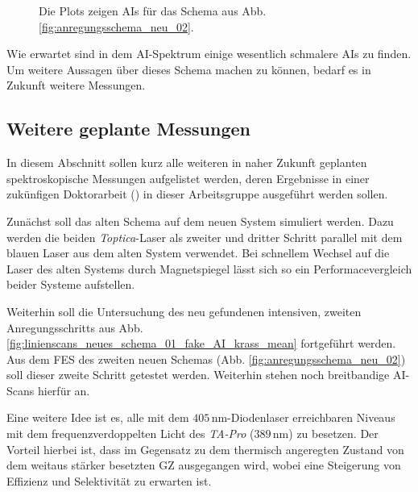 \begin{figure}[hp]
 	\centering
 	\footnotesize
	\caption[erster und zweiter Anregungsschritt, neues System, Schema (2)]{Die
	Plots zeigen AIs für das Schema aus Abb. \ref{fig:anregungsschema_neu_02}.}
	\label{fig:linienscans_neues_schema_02_AIs}
\end{figure}
Wie erwartet sind in dem AI-Spektrum einige wesentlich schmalere AIs zu finden.
Um weitere Aussagen über dieses Schema machen zu können, bedarf es in
Zukunft weitere Messungen.

\subsection{Weitere geplante
Messungen}\label{subsec:geplante_messungen}
In diesem Abschnitt sollen kurz alle weiteren in naher Zukunft geplanten
spektroskopische Messungen aufgelistet werden, deren Ergebnisse in einer
zukünfigen Doktorarbeit (\cite{hakimi:2012:dissertation}) in dieser Arbeitsgruppe ausgeführt werden
sollen.\par
Zunächst soll das alten Schema auf dem neuen System simuliert werden. Dazu
werden die beiden \textit{Toptica}-Laser als zweiter und dritter Schritt
parallel mit dem blauen Laser aus dem alten System verwendet. Bei schnellem
Wechsel auf die Laser des alten Systems durch Magnetspiegel lässt sich so ein
Performacevergleich beider Systeme aufstellen.\par
Weiterhin soll die Untersuchung des neu gefundenen intensiven, zweiten
Anregungsschritts aus Abb.
\ref{fig:linienscans_neues_schema_01_fake_AI_krass_mean} fortgeführt werden. Aus
dem FES des zweiten neuen Schemas
(Abb. \ref{fig:anregungsschema_neu_02}) soll dieser zweite Schritt getestet
werden. Weiterhin stehen noch breitbandige AI-Scans hierfür an.\par
Eine weitere Idee ist es, alle mit dem $405\,$nm-Diodenlaser erreichbaren
Niveaus mit dem frequenzverdoppelten Licht des \textit{TA-Pro} ($389\,$nm) zu
besetzen. Der Vorteil hierbei ist, dass im Gegensatz zu dem thermisch angeregten
Zustand von dem weitaus stärker besetzten GZ ausgegangen wird, wobei eine
Steigerung von Effizienz und Selektivität zu erwarten ist.

